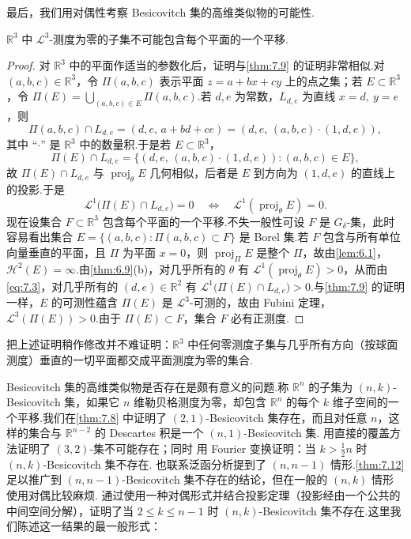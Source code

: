 最后，我们用对偶性考察 Besicovitch 集的高维类似物的可能性.

\begin{theorem}\label{thm:7.12}
$\mathbb{R}^3$ 中 $\mathscr{L}^3$-测度为零的子集不可能包含每个平面的一个平移.
\end{theorem}

\begin{proof}
对 $\mathbb{R}^3$ 中的平面作适当的参数化后，证明与\cref{thm:7.9} 的证明非常相似.对 $(a,b,c)\in\mathbb{R}^3$，令 $\Pi(a,b,c)$ 表示平面 $z=a+bx+cy$ 上的点之集；若 $E\subset\mathbb{R}^3$，令 $\Pi(E)=\bigcup_{(a,b,c)\in E}\Pi(a,b,c)$.若 $d,e$ 为常数，$L_{d,e}$ 为直线 $x=d,\ y=e$，则
\[
  \Pi(a,b,c)\cap L_{d,e}=(d,e,\,a+bd+ce)=(d,e,\,(a,b,c)\cdot(1,d,e)),
\]
其中 ``$\cdot$'' 是 $\mathbb{R}^3$ 中的数量积.于是若 $E\subset\mathbb{R}^3$，
\[
  \Pi(E)\cap L_{d,e}=\{(d,e,\,(a,b,c)\cdot(1,d,e)):(a,b,c)\in E\},
\]
故 $\Pi(E)\cap L_{d,e}$ 与 $\operatorname{proj}_{\theta}E$ 几何相似，后者是 $E$ 到方向为 $(1,d,e)$ 的直线上的投影.于是
\begin{equation}\label{eq:7.3}
  \mathscr{L}^{1}\bigl(\Pi(E)\cap L_{d,e}\bigr)=0
  \quad\Longleftrightarrow\quad
  \mathscr{L}^{1}(\operatorname{proj}_{\theta}E)=0.
\end{equation}
现在设集合 $F\subset\mathbb{R}^3$ 包含每个平面的一个平移.不失一般性可设 $F$ 是 $G_{\delta}$-集，此时容易看出集合 $E=\{(a,b,c):\Pi(a,b,c)\subset F\}$ 是 Borel 集.若 $F$ 包含与所有单位向量垂直的平面，且 $\Pi$ 为平面 $x=0$，则 $\operatorname{proj}_{\Pi}E$ 是整个 $\Pi$，故由\cref{lem:6.1}，$\mathcal{H}^2(E)=\infty$.由\cref{thm:6.9}(b)，对几乎所有的 $\theta$ 有 $\mathscr{L}^1(\operatorname{proj}_{\theta}E)>0$，从而由 \eqref{eq:7.3}，对几乎所有的 $(d,e)\in\mathbb{R}^2$ 有 $\mathscr{L}^1\bigl(\Pi(E)\cap L_{d,e}\bigr)>0$.与\cref{thm:7.9} 的证明一样，$E$ 的可测性蕴含 $\Pi(E)$ 是 $\mathscr{L}^3$-可测的，故由 Fubini 定理，$\mathscr{L}^3(\Pi(E))>0$.由于 $\Pi(E)\subset F$，集合 $F$ 必有正测度.
\end{proof}

把上述证明稍作修改并不难证明：$\mathbb{R}^3$ 中任何零测度子集与几乎所有方向（按球面测度）垂直的一切平面都交成平面测度为零的集合.

Besicovitch 集的高维类似物是否存在是颇有意义的问题.称 $\mathbb{R}^n$ 的子集为 $(n,k)$-Besicovitch 集，如果它 $n$ 维勒贝格测度为零，却包含 $\mathbb{R}^n$ 的每个 $k$ 维子空间的一个平移.我们在\cref{thm:7.8} 中证明了 $(2,1)$-Besicovitch 集存在，而且对任意 $n$，这样的集合与 $\mathbb{R}^{n-2}$ 的 Descartes 积是一个 $(n,1)$-Besicovitch 集.\textcite{marstrand1979b} 用直接的覆盖方法证明了 $(3,2)$-集不可能存在；同时 \textcite{falconer1980a} 用 Fourier 变换证明：当 $k>\frac{1}{2}n$ 时 $(n,k)$-Besicovitch 集不存在.\textcite{oberlinstein1982} 也联系泛函分析提到了 $(n,n-1)$ 情形.\cref{thm:7.12} 足以推广到 $(n,n-1)$-Besicovitch 集不存在的结论，但在一般的 $(n,k)$ 情形使用对偶比较麻烦.\textcite{falconer1980b} 通过使用一种对偶形式并结合投影定理（投影经由一个公共的中间空间分解），证明了当 $2\leq k\leq n-1$ 时 $(n,k)$-Besicovitch 集不存在.这里我们陈述这一结果的最一般形式：

